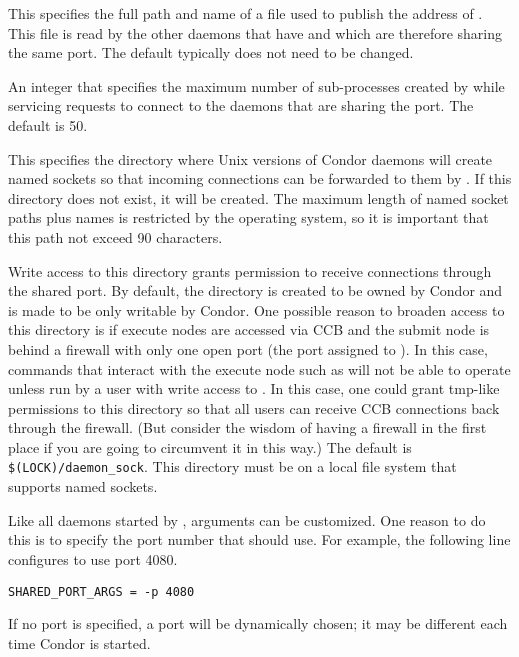 \begin{description}

\label{param:SharedPortDaemonAdFile}
\item[\Macro{SHARED\_PORT\_DAEMON\_AD\_FILE}]
  This specifies the full path and name of a file used to publish the
  address of .  This file is read by the other
  daemons that have  and which are therefore
  sharing the same port.  The default typically does not need to be changed.

\label{param:SharedPortMaxWorkers}
\item[\Macro{SHARED\_PORT\_MAX\_WORKERS}] An integer that specifies
 the maximum number of sub-processes created by 
 while servicing requests to connect to the daemons that are sharing the port.
 The default is 50.

\label{param:DaemonSocketDir}
\item[\Macro{DAEMON\_SOCKET\_DIR}] This specifies the directory where
 Unix versions of Condor daemons will create named sockets so that incoming
 connections can be forwarded to them by .  If
 this directory does not exist, it will be created. The maximum length
 of named socket paths plus names is restricted by the operating system,
 so it is important that this path not exceed 90 characters.

Write access to this directory grants permission to receive
 connections through the shared port.  By default, the directory is
 created to be owned by Condor and is made to be only writable by
 Condor.  One possible reason to broaden access to this directory is
 if execute nodes are accessed via CCB and the submit node is behind a
 firewall with only one open port (the port assigned to
 ).  In this case, commands that interact with
 the execute node such as  will not be able to
 operate unless run by a user with write access to
 .  In this case, one could grant
 tmp-like permissions to this directory so that all users can receive
 CCB connections back through the firewall.  (But consider the wisdom
 of having a firewall in the first place if you are going to
 circumvent it in this way.)  The default
  is \verb|$(LOCK)/daemon_sock|.  This
 directory must be on a local file system that supports named sockets.

\label{param:SharedPortArgs}
\item[\Macro{SHARED\_PORT\_ARGS}] Like all daemons started by
 ,  arguments can be customized.
  One reason to do this is to specify the port number that
  should use.  For example, the following line
 configures  to use port 4080.

\begin{verbatim}
SHARED_PORT_ARGS = -p 4080
\end{verbatim}

If no port is specified, a port will be dynamically chosen; it may be
 different each time Condor is started.
\end{description}

